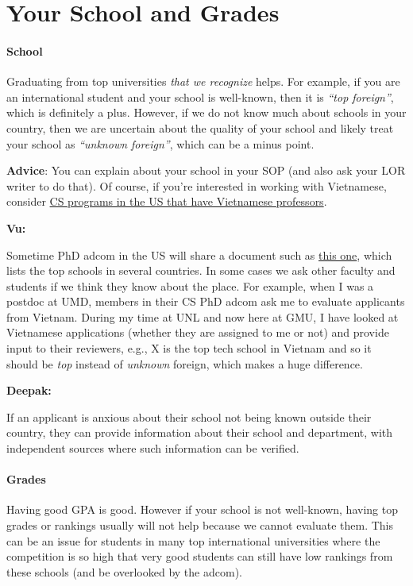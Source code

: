 \documentclass[oneside,11pt,dvipsnames]{book}
\newenvironment{commentbox}[1][]{
  \small
  \begin{mybox}
    {\small \textbf{#1}}
  }{
  \end{mybox}
}
\begin{document}
\section{Your School and Grades}\label{sec:your-school}

\paragraph{School} Graduating from top universities \emph{that we recognize} helps. For example, if you are an international student and your school is well-known, then it is \emph{``top foreign''}, which is definitely a plus.
However, if we do not know much about schools in your country, then we are uncertain about the quality of your school and  likely treat your school as \emph{``unknown foreign''}, which can be a minus point.


\textbf{Advice}: You can explain about your school in your SOP (and also ask your LOR writer to do that). Of course, if you're interested in working with Vietnamese, consider  \href{https://github.com/dynaroars/dynaroars.github.io/wiki/Viet-CS-Profs-US}{CS programs in the US that have Vietnamese professors}. %

\begin{commentbox}[Vu:]
  Sometime PhD adcom in the US will share a document such as \href{https://github.com/dynaroars/dynaroars.github.io/wiki/Foreign-Top-Schools}{this one}, which lists the top schools in several countries. In some cases we ask other faculty and students if we think they know about the place.  For example, when I was a postdoc at UMD, members in their CS PhD adcom ask me to evaluate applicants from Vietnam.  During my time at UNL and now here at GMU, I have looked at Vietnamese applications (whether they are assigned to me or not) and provide input to their reviewers, e.g., X is the top tech school in Vietnam and so it should be \emph{top} instead of \emph{unknown} foreign, which makes a huge difference.
\end{commentbox}
\begin{commentbox}[Deepak:]
  If an applicant is anxious about their school not being known outside their country, they can provide information about their school and department, with independent sources where such information can be verified.
\end{commentbox}

\paragraph{Grades} Having good GPA is good. However if your school is not well-known, having top grades or rankings
usually will not help because we cannot evaluate them.  This can be an issue for students in many top international universities where the competition is so high that very good students can still have low rankings from these schools (and be overlooked by the adcom).
\end{document}
